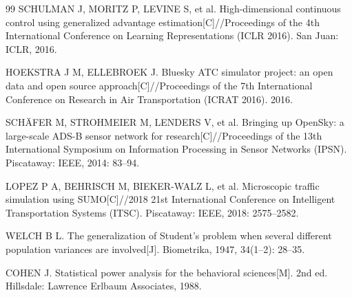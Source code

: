 \documentclass[12pt,a4paper,UTF8]{ctexart}
\begin{document}
\begin{thebibliography}{99}
 SCHULMAN J, MORITZ P, LEVINE S, et al. High-dimensional continuous control using generalized advantage estimation[C]//Proceedings of the 4th International Conference on Learning Representations (ICLR 2016). San Juan: ICLR, 2016.

 HOEKSTRA J M, ELLEBROEK J. Bluesky ATC simulator project: an open data and open source approach[C]//Proceedings of the 7th International Conference on Research in Air Transportation (ICRAT 2016). 2016.

 SCH\"{A}FER M, STROHMEIER M, LENDERS V, et al. Bringing up OpenSky: a large-scale ADS-B sensor network for research[C]//Proceedings of the 13th International Symposium on Information Processing in Sensor Networks (IPSN). Piscataway: IEEE, 2014: 83--94.

 LOPEZ P A, BEHRISCH M, BIEKER-WALZ L, et al. Microscopic traffic simulation using SUMO[C]//2018 21st International Conference on Intelligent Transportation Systems (ITSC). Piscataway: IEEE, 2018: 2575--2582.

 WELCH B L. The generalization of Student's problem when several different population variances are involved[J]. Biometrika, 1947, 34(1--2): 28--35.

 COHEN J. Statistical power analysis for the behavioral sciences[M]. 2nd ed. Hillsdale: Lawrence Erlbaum Associates, 1988.
\end{thebibliography}
\end{document}
